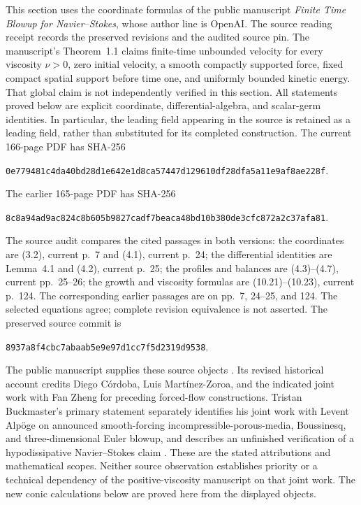 This section uses the coordinate formulas of the public manuscript
\emph{Finite Time Blowup for Navier--Stokes}, whose author line is
OpenAI. The source reading receipt records the preserved revisions and
the audited source pin. The manuscript's Theorem~1.1 claims finite-time
unbounded velocity for every viscosity $\nu>0$, zero initial velocity,
a smooth compactly supported force, fixed compact spatial support before
time one, and uniformly bounded kinetic energy. That global claim is
not independently verified in this section. All statements proved below
are explicit coordinate, differential-algebra, and scalar-germ identities.
In particular, the leading field appearing in the source is retained as
a leading field, rather than substituted for its completed construction.
The current 166-page PDF has SHA-256
\begin{center}\small\texttt{0e779481c4da40bd28d1e642e1d8ca57447d129610df28dfa5a11e9af8ae228f}.\end{center}
The earlier 165-page PDF has SHA-256
\begin{center}\small\texttt{8c8a94ad9ac824c8b605b9827cadf7beaca48bd10b380de3cfc872a2c37afa81}.\end{center}
The source audit compares the cited passages in both versions: the
coordinates are (3.2), current p.~7 and (4.1), current p.~24;
the differential identities are Lemma~4.1 and (4.2), current p.~25;
the profiles and balances are (4.3)--(4.7), current pp.~25--26;
the growth and viscosity formulas are (10.21)--(10.23), current
p.~124. The corresponding earlier passages are on pp.~7, 24--25,
and 124. The selected equations agree; complete revision equivalence
is not asserted. The preserved source commit is
\begin{center}\small\texttt{8937a8f4cbc7abaab5e9e97d1cc7f5d2319d9538}.\end{center}
The public manuscript supplies these source objects
\cite{OpenAINSBridge2026}. Its revised historical account credits
Diego C\'ordoba, Luis Mart\'inez-Zoroa, and the indicated joint work
with Fan Zheng for preceding forced-flow constructions.
Tristan Buckmaster's primary statement separately identifies his
joint work with Levent Alp\"oge on announced smooth-forcing
incompressible-porous-media, Boussinesq, and three-dimensional Euler
blowup, and describes an unfinished verification of a hypodissipative
Navier--Stokes claim \cite{BuckmasterStatementBridge2026}.
These are the stated attributions and mathematical scopes. Neither
source observation establishes priority or a technical dependency
of the positive-viscosity manuscript on that joint work. The new
conic calculations below are proved here from the displayed objects.

